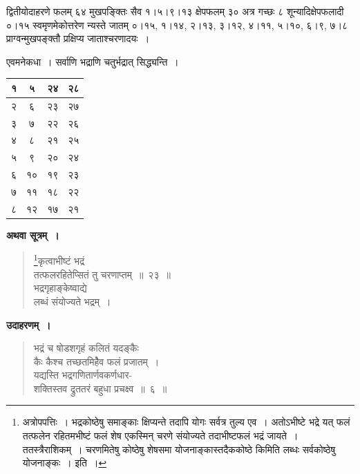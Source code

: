 \documentclass[11pt, openany]{book}
\begin{document}
\vspace{2mm}

द्वितीयोदाहरणे फलम् ६४ मुखपङ्क्तिः सैव १।५।९।१३ क्षेपफलम् ३० अत्र गच्छः ८ शून्यादिक्षेपफलादी ०।१५ स्वमृणमेकोत्तरेण न्यस्ते जातम् ०।१५, १।१४, २।१३, ३।१२, ४।११, ५।१०, ६।९, ७।८ प्राग्वन्मुखपङ्क्तौ प्रक्षिप्य जाताश्चरणादयः~।
\vspace{2mm}

एवमनेकधा~। सर्वाणि भद्राणि चतुर्भद्रात् सिद्ध्यन्ति~।
\vspace{1mm}

\begin{table}[h]
\setlength{\extrarowheight}{2pt} \setlength{\tabcolsep}{4pt}	
\centering
\begin{tabular}{|c|c|c|c|}
\hline
१ & ५ & २४ & २८\\
\hline
२ & ६ & २३ & २७\\
\hline
३ & ७ & २२ & २६\\
\hline
४ & ८ & २१ & २५\\
\hline
५ & ९ & २० & २४\\
\hline
६ & १० & १९ & २३\\
\hline
७ & ११ & १८ & २२\\
\hline
८ & १२ & १७ & २१\\
\hline
\end{tabular}
\end{table}

\newpage

\textbf{अथवा सूत्रम्~।}

\begin{quote}
\renewcommand{\thefootnote}{१}\footnote{अत्रोपपत्तिः~। भद्रकोष्ठेषु समाङ्काः क्षिप्यन्ते तदापि योगः सर्वत्र तुल्य एव~। अतोऽभीष्टे भद्रे यत् फलं तत्फलेन रहितमभीष्टं फलं शेष एकस्मिन् चरणे संयोज्यते तदाभीष्टफलं भद्रं जायते~। ततस्त्रैराशिकम्~। चरणमितेषु कोष्ठेषु शेषसमा योजनाङ्कास्तदैककोष्ठे किमिति लब्धः सर्वकोष्ठेषु योजनाङ्कः~। इति~।}{\gk कृत्वाभीष्टं भद्रं\\
तत्फलरहितेप्सितं तु चरणाप्तम्~॥~२३~॥\\
भद्रगृहाङ्केष्वाद्ये\\
लब्धं संयोज्यते भद्रम्~।}
\end{quote}

\textbf{उदाहरणम्~।}

\begin{quote}
{\ex भद्रं च षोडशगृहं कलितं यदङ्कैः\\
कैः कैश्च तच्छतमिहेैव फलं प्रजातम्~।\\
यद्यस्ति भद्रगणितार्णवकर्णधार-\\
शक्तिस्तव द्रुततरं बहुधा प्रचक्ष्व~॥~६~॥}	
\end{quote}
\end{document}
